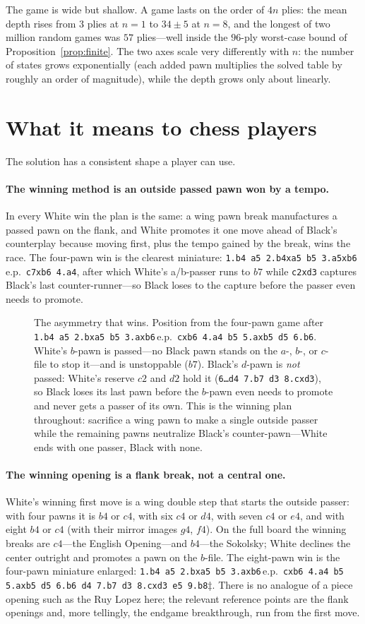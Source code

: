 \documentclass[11pt]{article}
\theoremstyle{plain}
\theoremstyle{definition}
\newcommand{\nEightLossOpening}{$b4$ or $c4$ (with their mirror images $g4$, $f4$)}
\newcommand{\nEightLossPVfour}{\texttt{1.b4 a5 2.b4xa5 b5 3.a5xb6}\,e.p.\
\texttt{c7xb6 4.a4}, after which White's a/b-passer runs to $b7$ while
\texttt{c2xd3} captures Black's last counter-runner---so Black loses to the
capture before the passer even needs to promote.}
\newcommand{\nEightLossPVeight}{\texttt{1.b4 a5 2.bxa5 b5 3.axb6}\,e.p.\
\texttt{cxb6 4.a4 b5 5.axb5 d5 6.b6 d4 7.b7 d3 8.cxd3 e5 9.b8}$\ddagger$}
\newcommand{\pg}[1]{\chessboard[setfen={#1}, showmover=false, boardfontsize=13pt, label=false]}
\begin{document}
The game is wide but shallow. A game lasts on the order of $4n$ plies: the mean
depth rises from $3$ plies at $n=1$ to $34\pm5$ at $n=8$, and the longest of two
million random games was $57$ plies---well inside the $96$-ply worst-case bound of
Proposition~\ref{prop:finite}. The two axes scale very differently with $n$: the
number of states grows exponentially (each added pawn multiplies the solved table
by roughly an order of magnitude), while the depth grows only about linearly.

\section{What it means to chess players}\label{sec:chess}

The solution has a consistent shape a player can use.

\paragraph{The winning method is an outside passed pawn won by a tempo.} In every
White win the plan is the same: a wing pawn break manufactures a passed pawn on
the flank, and White promotes it one move ahead of Black's counterplay because
moving first, plus the tempo gained by the break, wins the race. The four-pawn
win is the clearest miniature: \nEightLossPVfour

\begin{figure}[t]
\centering
\pg{8/8/1P6/3p4/8/8/2PP4/8 b - - 0 1}
\caption{The asymmetry that wins. Position from the four-pawn game after
\texttt{1.b4 a5 2.bxa5 b5 3.axb6}\,e.p.\ \texttt{cxb6 4.a4 b5 5.axb5 d5 6.b6}.
White's $b$-pawn is passed---no Black pawn stands on the $a$-, $b$-, or $c$-file
to stop it---and is unstoppable ($b7$). Black's $d$-pawn is \emph{not} passed:
White's reserve $c2$ and $d2$ hold it (\texttt{6\dots d4 7.b7 d3 8.cxd3}), so Black
loses its last pawn before the $b$-pawn even needs to promote and never gets a
passer of its own. This is the winning plan throughout:
sacrifice a wing pawn to make a single outside passer while the remaining pawns
neutralize Black's counter-pawn---White ends with one passer, Black with none.}
\label{fig:break}
\end{figure}

\paragraph{The winning opening is a flank break, not a central one.} White's
winning first move is a wing double step that starts the outside passer: with
four pawns it is $b4$ or $c4$, with six $c4$ or $d4$, with seven $c4$ or $e4$,
and with eight \nEightLossOpening. On the full board the winning breaks are
$c4$---the English Opening---and $b4$---the Sokolsky; White declines the center
outright and promotes a pawn on the $b$-file. The eight-pawn win is the four-pawn
miniature enlarged: \nEightLossPVeight. There is no analogue of a piece opening
such as the Ruy Lopez here; the relevant reference points are the flank openings
and, more tellingly, the endgame breakthrough, run from the first move.
\end{document}

